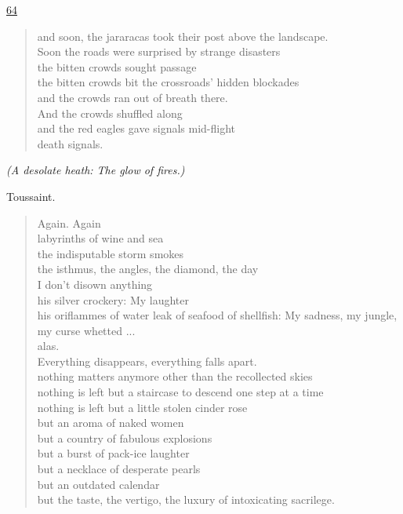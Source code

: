 \documentclass[letterpaper,article,12pt,oneside,notitlepage]{memoir}
\begin{document}
\href{http://cesaire.elotroalex.com/chiens/chiens/p064.html}{64}

\begin{verse}
and soon, the jararacas took their post above the landscape. \\
Soon the roads were surprised by strange disasters \\
the bitten crowds sought passage \\
the bitten crowds bit the crossroads' hidden blockades \\
and the crowds ran out of breath there. \\
And the crowds shuffled along \\
and the red eagles gave signals mid-flight \\
death signals. \\
\end{verse}

\textit{(A desolate heath: The glow of fires.)}

\begin{center}Toussaint.\end{center}

\begin{verse}
\hspace{1cm} Again. Again \\
labyrinths of wine and sea \\
the indisputable storm smokes \\
the isthmus, the angles, the diamond, the day \\
I don't disown anything \\
his silver crockery: My laughter \\
his oriflammes of water leak of seafood of shellfish: My sadness, my jungle, my curse whetted ... \\
alas. \\
Everything disappears, everything falls apart. \\
nothing matters anymore other than the recollected skies \\
nothing is left but a staircase to descend one step at a time \\
nothing is left but a little stolen cinder rose \\
but an aroma of naked women \\
but a country of fabulous explosions \\
but a burst of pack-ice laughter \\
but a necklace of desperate pearls \\
but an outdated calendar \\
but the taste, the vertigo, the luxury of intoxicating sacrilege. \\
\end{verse}
\end{document}
